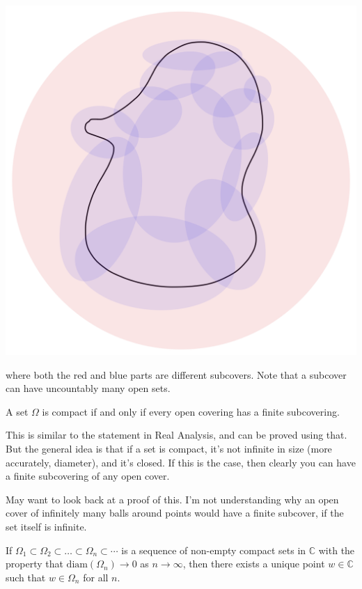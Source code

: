 \documentclass[12pt]{article}
\begin{document}
\par \begin{center} \includegraphics[scale=.2]{1-3.png} \end{center}

where both the red and blue parts are different subcovers. Note that a subcover can have 
uncountably many open sets.

\begin{theorem}{}
  A set $\Omega$ is compact if and only if every open covering has a finite subcovering.
\end{theorem}

This is similar to the statement in Real Analysis, and can be proved using that. But the general idea 
is that if a set is compact, it's not infinite in size (more accurately, diameter), and it's closed. If
this is the case, then clearly you can have a finite subcovering of any open cover. 

\begin{uq}
  May want to look back at a proof of this. I'm not understanding why an open cover of infinitely many balls 
  around points would have a finite subcover, if the set itself is infinite.
\end{uq}

\begin{theorem}{}
  If $\Omega_1 \subset \Omega_2 \subset \dots \subset \Omega_n \subset \cdots$ is a sequence of 
  non-empty compact sets in $\mathbb{C}$ with the property that $\text{diam}(\Omega_n) \to 0$ 
  as $n \to \infty$, then there exists a unique point $w \in \mathbb{C}$ such that $w \in \Omega_n$ 
  for all $n$.
\end{theorem}
\end{document}
